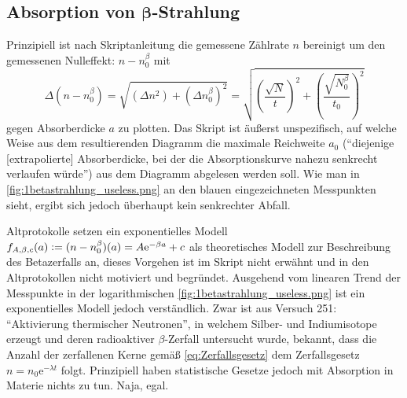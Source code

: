 \renewcommand{\thesubsection}{\thesection.\Roman{subsection}}
\vfill
\subsection[Absorption von Betastrahlung]{Absorption von \(\boldsymbol{\beta}\)-Strahlung}
Prinzipiell ist nach Skriptanleitung die gemessene Zählrate \(n\) bereinigt um den gemessenen Nulleffekt: \(n-n_0^\beta\) mit \begin{equation}
    \Delta (n-n_0^\beta)=\sqrt{\left(\Delta n^2\right)+\left(\Delta n_0^\beta\right)^2}=\sqrt{\left(\frac{\sqrt{N}}{t}\right)^2+\left(\frac{\sqrt{N_0^\beta}}{t_0}\right)^2}
\end{equation}
gegen Absorberdicke \(a\) zu plotten. Das Skript ist äußerst unspezifisch, auf welche Weise aus dem resultierenden Diagramm die maximale Reichweite \(a_0\) (\enquote{diejenige [extrapolierte] Absorberdicke, bei der die Absorptionskurve nahezu senkrecht verlaufen würde}) aus dem Diagramm abgelesen werden soll. Wie man in \cref{fig:1betastrahlung_useless.png} an den blauen eingezeichneten Messpunkten sieht, ergibt sich jedoch überhaupt kein senkrechter Abfall.
\FloatBarrier

Altprotokolle setzen ein exponentielles Modell \(f_{A,\beta,c}(a)\vcentcolon= (n-n_0^\beta)(a)=A\mathrm{e}^{-\beta a}+c\) als theoretisches Modell zur Beschreibung des Betazerfalls an, dieses Vorgehen ist im Skript nicht erwähnt und in den Altprotokollen nicht motiviert und begründet. Ausgehend vom linearen Trend der Messpunkte in der logarithmischen \cref{fig:1betastrahlung_useless.png} ist ein exponentielles Modell jedoch verständlich. Zwar ist aus Versuch 251: \enquote{Aktivierung thermischer Neutronen}, in welchem Silber- und Indiumisotope erzeugt und deren radioaktiver \(\beta\)-Zerfall untersucht wurde, bekannt, dass die Anzahl der zerfallenen Kerne gemäß \cref{eq:Zerfallsgesetz} dem Zerfallsgesetz \(n=n_0\mathrm{e}^{-\lambda t}\) folgt. Prinzipiell haben statistische Gesetze jedoch mit Absorption in Materie nichts zu tun. Naja, egal. 

